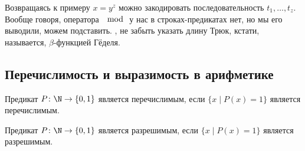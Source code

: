 Возвращаясь к примеру $x=y^z$ можно закодировать последовательность $t_1, \dots, t_z$.
Вообще говоря, оператора $\mod$ у нас в строках-предикатах нет, но мы его выводили, можем подставить.
\TODO, не забыть указать длину
Трюк, кстати, называется, $\beta$-функцией Гёделя.

\subsection{Перечислимость и выразимость в арифметике}

\begin{Def}
	Предикат $P \colon \N \to \{0, 1\}$ является перечислимым, если $\{ x \mid P(x) = 1 \}$ является перечислимым.
\end{Def}
\begin{Def}
	Предикат $P \colon \N \to \{0, 1\}$ является разрешимым, если $\{ x \mid P(x) = 1 \}$ является разрешимым.
\end{Def}

